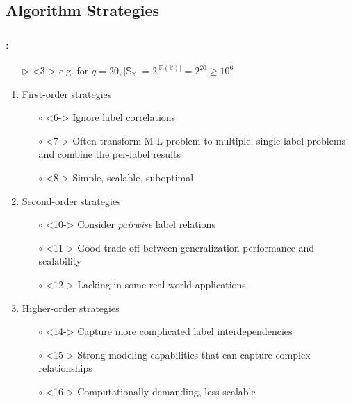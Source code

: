 \documentclass{beamer}
\begin{document}
\subsection{Algorithm Strategies}
\begin{frame}
\frametitle{\insertsection : \insertsubsection}
\begin{itemize}
\item[$\triangleright$] <3-> e.g. for $q=20, |\mathbb{S_Y}| = 2 ^ {|\mathbb{P(Y)}|} = 2^{20} \ge 10^6$
\end{itemize}

\begin{enumerate}
\item <5->First-order strategies
\begin{itemize}
\item[$\circ$] <6-> Ignore label correlations
\item[$\circ$] <7-> Often transform M-L problem to multiple, single-label problems
  and combine the per-label results
\item[$\circ$] <8-> Simple, scalable, suboptimal
\end{itemize}
\item <9-> Second-order strategies
\begin{itemize}
\item[$\circ$] <10-> Consider \emph{pairwise} label relations
\item[$\circ$] <11-> Good trade-off between generalization performance and scalability
\item[$\circ$] <12-> Lacking in some real-world applications
\end{itemize}
\item <13->Higher-order strategies
\begin{itemize}
\item[$\circ$] <14-> Capture more complicated label interdependencies
\item[$\circ$] <15-> Strong modeling capabilities that can capture complex relationships
\item[$\circ$] <16-> Computationally demanding, less scalable
\end{itemize}

\end{enumerate}
\end{frame}
\end{document}
